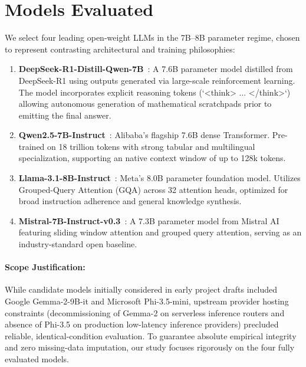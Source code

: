 \documentclass[11pt]{article}
\begin{document}
\section{Models Evaluated}
\label{sec:models}

We select four leading open-weight LLMs in the 7B--8B parameter regime, chosen to represent contrasting architectural and training philosophies:

\begin{enumerate}
    \item \textbf{DeepSeek-R1-Distill-Qwen-7B}~\citep{deepseek2025r1}: A 7.6B parameter model distilled from DeepSeek-R1 using outputs generated via large-scale reinforcement learning. The model incorporates explicit reasoning tokens (`<think> ... </think>`) allowing autonomous generation of mathematical scratchpads prior to emitting the final answer.
    \item \textbf{Qwen2.5-7B-Instruct}~\citep{yang2024qwen25}: Alibaba's flagship 7.6B dense Transformer. Pre-trained on 18 trillion tokens with strong tabular and multilingual specialization, supporting an native context window of up to 128k tokens.
    \item \textbf{Llama-3.1-8B-Instruct}~\citep{meta2024llama3}: Meta's 8.0B parameter foundation model. Utilizes Grouped-Query Attention (GQA) across 32 attention heads, optimized for broad instruction adherence and general knowledge synthesis.
    \item \textbf{Mistral-7B-Instruct-v0.3}~\citep{jiang2023mistral}: A 7.3B parameter model from Mistral AI featuring sliding window attention and grouped query attention, serving as an industry-standard open baseline.
\end{enumerate}

\paragraph{Scope Justification:} While candidate models initially considered in early project drafts included Google Gemma-2-9B-it and Microsoft Phi-3.5-mini, upstream provider hosting constraints (decommissioning of Gemma-2 on serverless inference routers and absence of Phi-3.5 on production low-latency inference providers) precluded reliable, identical-condition evaluation. To guarantee absolute empirical integrity and zero missing-data imputation, our study focuses rigorously on the four fully evaluated models.
\end{document}
